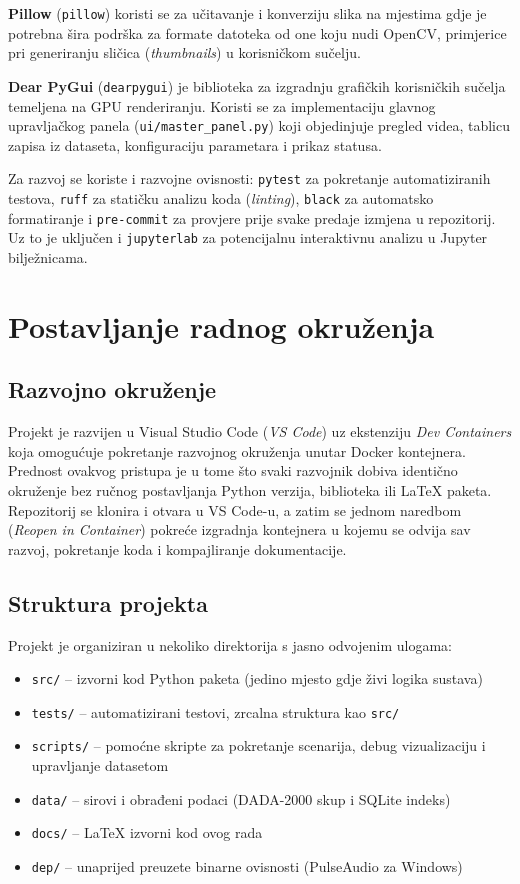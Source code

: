 \textbf{Pillow} (\texttt{pillow}) koristi se za učitavanje i konverziju slika na mjestima gdje je potrebna šira podrška za formate datoteka od one koju nudi OpenCV, primjerice pri generiranju sličica (\textit{thumbnails}) u korisničkom sučelju.

\textbf{Dear PyGui} (\texttt{dearpygui}) je biblioteka za izgradnju grafičkih korisničkih sučelja temeljena na GPU renderiranju. Koristi se za implementaciju glavnog upravljačkog panela (\texttt{ui/master\_panel.py}) koji objedinjuje pregled videa, tablicu zapisa iz dataseta, konfiguraciju parametara i prikaz statusa.

Za razvoj se koriste i razvojne ovisnosti: \texttt{pytest} za pokretanje automatiziranih testova, \texttt{ruff} za statičku analizu koda (\textit{linting}), \texttt{black} za automatsko formatiranje i \texttt{pre-commit} za provjere prije svake predaje izmjena u repozitorij. Uz to je uključen i \texttt{jupyterlab} za potencijalnu interaktivnu analizu u Jupyter bilježnicama.

\section{Postavljanje radnog okruženja}

\subsection{Razvojno okruženje}

Projekt je razvijen u Visual Studio Code (\textit{VS Code}) uz ekstenziju \textit{Dev Containers} koja omogućuje pokretanje razvojnog okruženja unutar Docker kontejnera. Prednost ovakvog pristupa je u tome što svaki razvojnik dobiva identično okruženje bez ručnog postavljanja Python verzija, biblioteka ili LaTeX paketa. Repozitorij se klonira i otvara u VS Code-u, a zatim se jednom naredbom (\textit{Reopen in Container}) pokreće izgradnja kontejnera u kojemu se odvija sav razvoj, pokretanje koda i kompajliranje dokumentacije.

\subsection{Struktura projekta}

Projekt je organiziran u nekoliko direktorija s jasno odvojenim ulogama:
\begin{itemize}
    \item \texttt{src/} -- izvorni kod Python paketa (jedino mjesto gdje živi logika sustava)
    \item \texttt{tests/} -- automatizirani testovi, zrcalna struktura kao \texttt{src/}
    \item \texttt{scripts/} -- pomoćne skripte za pokretanje scenarija, debug vizualizaciju i upravljanje datasetom
    \item \texttt{data/} -- sirovi i obrađeni podaci (DADA-2000 skup i SQLite indeks)
    \item \texttt{docs/} -- LaTeX izvorni kod ovog rada
    \item \texttt{dep/} -- unaprijed preuzete binarne ovisnosti (PulseAudio za Windows)
\end{itemize}

